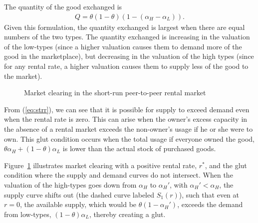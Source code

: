 \documentclass[11pt]{article}
\begin{document}
The quantity of the good exchanged is 
\begin{align} \label{eq:qty}
  Q = \theta (1-\theta) \left(1 - (\alpha_H - \alpha_L)\right).
\end{align} 
Given this formulation, the quantity exchanged is largest when there are equal numbers of the two types.
The quantity exchanged is increasing in the valuation of the low-types (since a higher valuation causes them to demand more of the good in the marketplace), but decreasing in the valuation of the high types (since for any rental rate, a higher valuation causes them to supply less of the good to the market). 
 
\newcommand*{\alphaH}{0.80}%
\newcommand*{\alphaL}{0.50}%
\newcommand*{\alphaHp}{0.40}
\pgfmathsetmacro{\r}{-1 + \alphaH + \alphaL}%
\pgfmathsetmacro{\Q}{\alphaL - \r/2}
\begin{figure} 
\caption{Market clearing in the short-run peer-to-peer rental market} 
\label{fig:market_clearing} 
\begin{center}
\end{center}
\end{figure} 

From (\ref{eq:strr}), we can see that it is possible for supply to exceed demand even when the rental rate is zero. 
This can arise when the owner's excess capacity in the absence of a
rental market exceeds the non-owner's usage if he or she were to own. 
This glut condition occurs when the total usage if everyone owned the good, $\theta \alpha_H + (1-\theta)\alpha_L$ is lower than the actual stock of purchased goods. 

Figure~\ref{fig:market_clearing} illustrates market clearing with a positive rental rate, $r^*$, and the glut condition where the supply and demand curves do not intersect.
When the valuation of the high-types goes down from $\alpha_H$ to $\alpha_H'$, with $\alpha_H' < \alpha_H$, the supply curve shifts out (the dashed curve labeled $S_1(r)$), such that even at $r = 0$, the available supply, which would be $\theta (1-\alpha_H')$, exceeds the demand from low-types, $(1-\theta)\alpha_L$, thereby creating a glut.  
\end{document}
